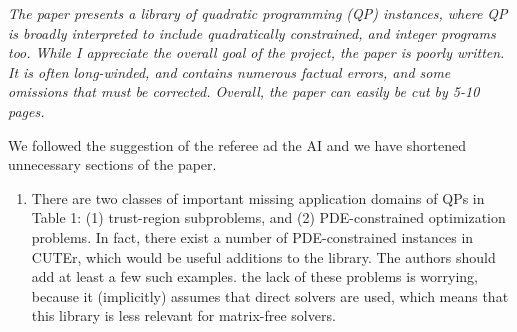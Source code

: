 \documentclass[11pt]{article}
\newcommand{\rep}[1]{{\textcolor{acblue}{#1}}}
\begin{document}
{\it
The paper presents a library of quadratic programming (QP) instances, where QP is broadly interpreted
to include quadratically constrained, and integer programs too. While I appreciate the overall goal of
the project, the paper is poorly written. It is often long-winded, and contains numerous factual errors,
and some omissions that must be corrected. Overall, the paper can easily be cut by 5-10 pages.
}

\rep{We followed the suggestion of the referee ad the AI and we have shortened unnecessary sections of the paper.}

{\it
\begin{enumerate}

\item There are two classes of important missing application domains of QPs in Table 1: (1) trust-region subproblems, and (2) PDE-constrained optimization problems. In fact, there exist a number of PDE-constrained instances in CUTEr, which would be useful additions to the library. The authors should add at least a few such examples. the lack of these problems is worrying, because
it (implicitly) assumes that direct solvers are used, which means that this library is less relevant for matrix-free solvers.


\end{enumerate}}
\end{document}
